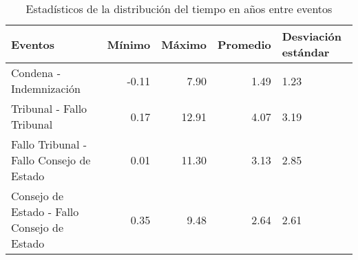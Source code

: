\begin{table}[htbp]
\centering
\caption{Estadísticos de la distribución del
tiempo en años entre eventos} 
\label{tab:eventos-otros}
\begin{tabular}{p{6cm}rrrR{2cm}}
  \hline
Eventos & Mínimo & Máximo & Promedio & Desviación estándar \\ 
  \hline
Condena - Indemnización & -0.11 & 7.90 & 1.49 & 1.23 \\ 
  Tribunal - Fallo Tribunal & 0.17 & 12.91 & 4.07 & 3.19 \\ 
  Fallo Tribunal - Fallo Consejo de Estado & 0.01 & 11.30 & 3.13 & 2.85 \\ 
  Consejo de Estado - Fallo Consejo de Estado & 0.35 & 9.48 & 2.64 & 2.61 \\ 
   \hline
\end{tabular}
\end{table}

